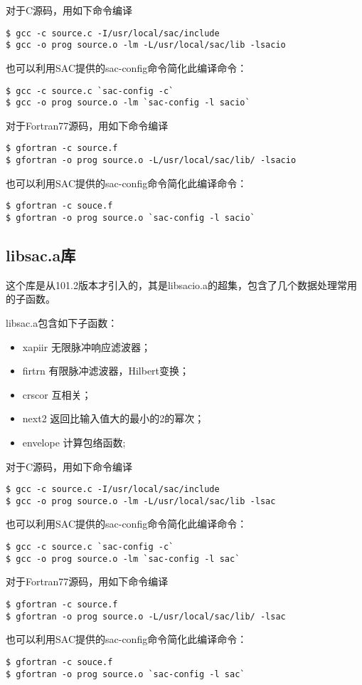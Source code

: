 对于C源码，用如下命令编译
\begin{verbatim}
$ gcc -c source.c -I/usr/local/sac/include
$ gcc -o prog source.o -lm -L/usr/local/sac/lib -lsacio
\end{verbatim}
也可以利用SAC提供的sac-config命令简化此编译命令：
\begin{verbatim}
$ gcc -c source.c `sac-config -c`
$ gcc -o prog source.o -lm `sac-config -l sacio`
\end{verbatim}

对于Fortran77源码，用如下命令编译
\begin{verbatim}
$ gfortran -c source.f
$ gfortran -o prog source.o -L/usr/local/sac/lib/ -lsacio
\end{verbatim}
也可以利用SAC提供的sac-config命令简化此编译命令：
\begin{verbatim}
$ gfortran -c souce.f
$ gfortran -o prog source.o `sac-config -l sacio`
\end{verbatim}

\subsection{libsac.a库}
这个库是从101.2版本才引入的，其是libsacio.a的超集，包含了几个数据处理常用的子函数。

libsac.a包含如下子函数：
\begin{itemize}
\item xapiir  无限脉冲响应滤波器；
\item firtrn  有限脉冲滤波器，Hilbert变换；
\item crscor  互相关；
\item next2   返回比输入值大的最小的2的幂次；
\item envelope 计算包络函数;
\end{itemize}

对于C源码，用如下命令编译
\begin{verbatim}
$ gcc -c source.c -I/usr/local/sac/include
$ gcc -o prog source.o -lm -L/usr/local/sac/lib -lsac
\end{verbatim}
也可以利用SAC提供的sac-config命令简化此编译命令：
\begin{verbatim}
$ gcc -c source.c `sac-config -c`
$ gcc -o prog source.o -lm `sac-config -l sac`
\end{verbatim}

对于Fortran77源码，用如下命令编译
\begin{verbatim}
$ gfortran -c source.f
$ gfortran -o prog source.o -L/usr/local/sac/lib/ -lsac
\end{verbatim}
也可以利用SAC提供的sac-config命令简化此编译命令：
\begin{verbatim}
$ gfortran -c souce.f
$ gfortran -o prog source.o `sac-config -l sac`
\end{verbatim}
